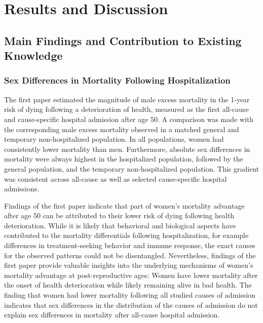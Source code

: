 

\section{Results and Discussion}

\subsection{Main Findings and Contribution to Existing Knowledge}

\subsubsection*{Sex Differences in Mortality Following Hospitalization}

The first paper estimated the magnitude of male excess mortality in 
the 1-year risk of dying following a deterioration of health, measured 
as the first all-cause and cause-specific hospital admission after 
age 50. A comparison was made with the corresponding male excess 
mortality observed in a matched general and temporary non-hospitalized 
population. In all populations, women had consistently lower mortality 
than men. Furthermore, absolute sex differences in mortality were 
always highest in the hospitalized population, followed by the general 
population, and the temporary non-hospitalized population. This gradient 
was consistent across all-cause as well as selected cause-specific 
hospital admissions.

Findings of the first paper indicate that part of women's mortality 
advantage after age 50 can be attributed to their lower risk of dying 
following health deterioration. While it is likely that 
behavioral and biological aspects have contributed to the mortality 
differentials following hospitalization, for example differences 
in treatment-seeking behavior and immune response,\citep{case2005sex,
juel2008men,oertelt2012influence,wang2014gender} the exact causes for 
the observed patterns could not be disentangled. Nevertheless, findings 
of the first paper provide valuable insights into the underlying mechanisms 
of women's mortality advantage at post-reproductive ages: Women have lower 
mortality after the onset of health deterioration while likely remaining 
alive in bad health. The finding that women had lower mortality 
following all studied causes of admission indicates that sex differences 
in the distribution of the causes of admission do not explain sex differences 
in mortality after all-cause hospital admission.\\

